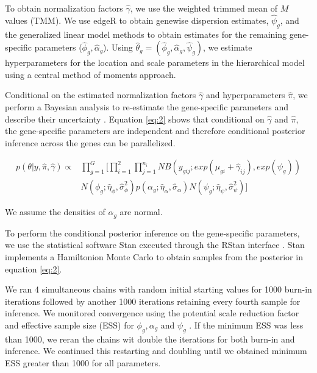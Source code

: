 \documentclass[11pt]{isuthesis}
\begin{document}
To obtain normalization factors $\hat{\gamma}$, we use the weighted trimmed mean of $M$ values (TMM). We use edgeR to obtain genewise dispersion estimates, $\hat{\psi}_g$, and the generalized linear model methods to obtain estimates for the remaining gene-specific parameters ($\hat{\phi}_g, \hat{\alpha}_g$)\cite{robinson2010scaling}. Using $\hat{\theta}_g = (\hat{\phi}_g , \hat{\alpha}_g, \hat{\psi}_g)$, we estimate hyperparameters for the location and scale parameters in the hierarchical model using a central method of moments approach. 

Conditional on the estimated normalization factors $\hat{\gamma}$ and hyperparameters $\hat{\pi}$, we perform a Bayesian analysis to re-estimate the gene-specific parameters and describe their uncertainty \cite{niemi2015empirical}. Equation \ref{eq:2} shows that conditional on $\hat{\gamma}$ and $\hat{\pi}$, the gene-specific parameters are independent and therefore conditional posterior inference across the genes can be parallelized. 

\begin{equation}
\label{eq:2}
\begin{split}
p(\theta | y, \hat{\pi}, \hat{\gamma})  \propto & \prod_{g=1}^{G} [ \prod_{i=1}^{2} \prod_{j=1}^{n_i} NB(y_{gij} ; exp(\mu_{gi} + \hat{\gamma}_{ij}), exp(\psi_g))
 \\ & N(\phi_g ; \hat{\eta}_{\phi}, \hat{\sigma}^2_{\phi}) p(\alpha_g ; \hat{\eta}_{\alpha}, \hat{\sigma}_{\alpha}) N(\psi_g ; \hat{\eta}_{\psi}, \hat{\sigma}^2_{\psi})  ]
\end{split}
\end{equation}

We assume the densities of $\alpha_g$ are normal.

To perform the conditional posterior inference on the gene-specific parameters, we use the statistical software Stan \cite{stan2014stan} executed through the RStan interface \cite{team2016rstan}. Stan implements a Hamiltonion Monte Carlo \cite{neal2011mcmc} to obtain samples from the posterior in equation \ref{eq:2}. 


We ran 4 simultaneous chains with random initial starting values for 1000 burn-in iterations followed by another 1000 iterations retaining every fourth sample for inference. We monitored convergence using the potential scale reduction factor and effective sample size (ESS) for $\phi_g, \alpha_g$ and $\psi_g$ \cite{gelman1992inference}. If the minimum ESS was less than 1000, we reran the chains wit double the iterations for both burn-in and inference. We continued this restarting and doubling until we obtained minimum ESS greater than 1000 for all parameters. 
\end{document}
